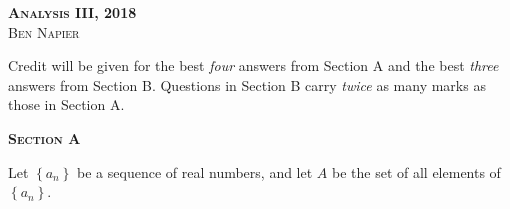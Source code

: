 \documentclass[a4paper, answers]{exam}
\begin{document}
\begin{center}
	\textbf{\textsc{Analysis III, 2018}} \\
	\textsc{Ben Napier}
	\vspace{1em}
\end{center}

Credit will be given for the best \emph{four} answers from Section A
and the best \emph{three} answers from Section B.
Questions in Section B carry \emph{twice} as many marks as those in Section A.

\begin{center}
	\textsc{\textbf{Section A}}
\end{center}

\begin{questions}
	\question

	\question
	Let $\left\{a_n\right\}$ be a sequence of real numbers, 
	and let $A$ be the set of all elements of $\left\{a_n\right\}$.


\end{questions}
\end{document}
